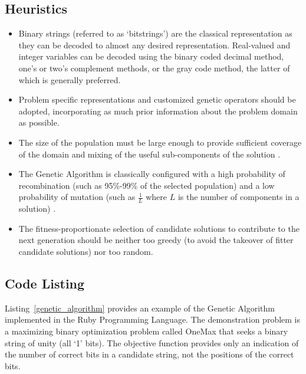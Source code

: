 \subsection{Heuristics}
\begin{itemize}
	\item Binary strings (referred to as `bitstrings') are the classical representation as they can be decoded to almost any desired representation. Real-valued and integer variables can be decoded using the binary coded decimal method, one's or two's complement methods, or the gray code method, the latter of which is generally preferred.
	\item Problem specific representations and customized genetic operators should be adopted, incorporating as much prior information about the problem domain as possible.
	\item The size of the population must be large enough to provide sufficient coverage of the domain and mixing of the useful sub-components of the solution  \cite{Goldberg1992}.
	\item The Genetic Algorithm is classically configured with a high probability of recombination (such as 95\%-99\% of the selected population) and a low probability of mutation (such as $\frac{1}{L}$ where $L$ is the number of components in a solution) \cite{Muhlenbein1992, Back1993}.
	\item The fitness-proportionate selection of candidate solutions to contribute to the next generation should be neither too greedy (to avoid the takeover of fitter candidate solutions) nor too random.
\end{itemize}

\subsection{Code Listing}
Listing~\ref{genetic_algorithm} provides an example of the Genetic Algorithm implemented in the Ruby Programming Language. 
The demonstration problem is a maximizing binary optimization problem called OneMax that seeks a binary string of unity (all `1' bits). The objective function provides only an indication of the number of correct bits in a candidate string, not the positions of the correct bits.

